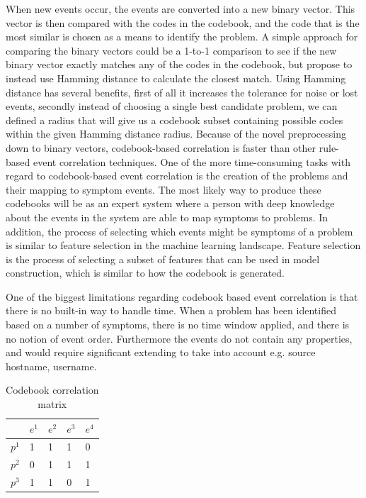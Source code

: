 When new events occur, the events are converted into a new binary vector. This vector is then compared with the codes in the codebook, and the code that is the most similar is chosen as a means to identify the problem. A simple approach for comparing the binary vectors could be a 1-to-1 comparison to see if the new binary vector exactly matches any of the codes in the codebook, but \cite{yemini_1996} propose to instead use Hamming distance to calculate the closest match. Using Hamming distance has several benefits, first of all it increases the tolerance for noise or lost events, secondly instead of choosing a single best candidate problem, we can defined a radius that will give us a codebook subset containing possible codes within the given Hamming distance radius.
Because of the novel preprocessing down to binary vectors, codebook-based correlation is faster than other rule-based event correlation techniques. One of the more time-consuming tasks with regard to codebook-based event correlation is the creation of the problems and their mapping to symptom events. The most likely way to produce these codebooks will be as an expert system where a person with deep knowledge about the events in the system are able to map symptoms to problems. In addition, the process of selecting which events might be symptoms of a problem is similar to feature selection in the machine learning landscape. Feature selection is the process of selecting a subset of features that can be used in model construction, which is similar to how the codebook is generated.

One of the biggest limitations regarding codebook based event correlation is that there is no built-in way to handle time. When a problem has been identified based on a number of symptoms, there is no time window applied, and there is no notion of event order. Furthermore the events do not contain any properties, and would require significant extending to take into account e.g. source hostname, username.

\begin{table}[ht]
\centering
\begin{tabular}{l|llll}
 & $e^1$ & $e^2$ & $e^3$ & $e^4$ \\ \hline
$p^1$ & 1 & 1 & 1 & 0 \\
$p^2$ & 0 & 1 & 1 & 1 \\
$p^3$ & 1 & 1 & 0 & 1
\end{tabular}
\caption{Codebook correlation matrix}
\label{tab:correlation-matrix}
\end{table}

